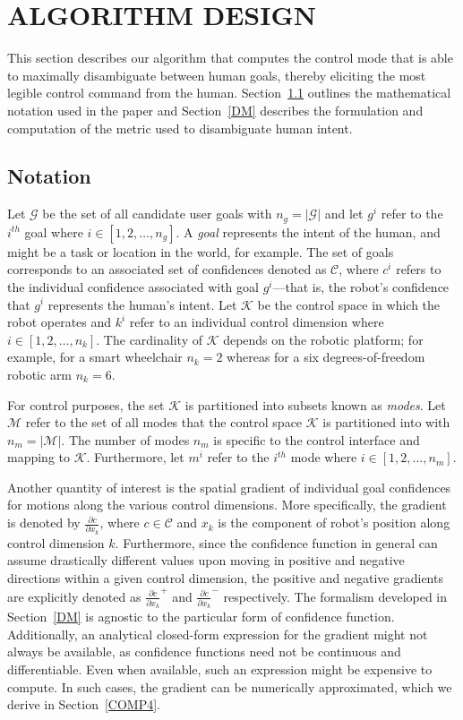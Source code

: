 \documentclass[conference]{IEEEtran}
\begin{document}
\section{ALGORITHM DESIGN} \label{ALGO}
This section describes our algorithm that computes the control mode that is able to maximally disambiguate between human goals, thereby eliciting the most legible control command from the human. Section~\ref{NOT} outlines the mathematical notation used in the paper and Section~\ref{DM} describes the formulation and computation of the metric used to disambiguate human intent. 

\subsection{Notation}\label{NOT}

Let $\mathcal{G}$ be the set of all candidate user goals with $n_g = \vert\mathcal{G}\vert$ and let $g^{i}$ refer to the $i^{th}$ goal where $i \in [1,2,\dots,n_g]$. A \textit{goal} represents the intent of the human, and might be a task or location in the world, for example. The set of goals corresponds to an associated set of confidences denoted as $\mathcal{C}$, where $c^{i}$ refers to the individual confidence associated with goal $g^{i}$---that is, the robot's confidence that $g^{i}$ represents the human's intent. Let $\mathcal{K}$ be the control space in which the robot operates and $k^{i}$ refer to an individual control dimension where $i \in [1,2,\dots,n_k]$.  The cardinality of $\mathcal{K}$ depends on the robotic platform; for example, for a smart wheelchair $n_k = 2$ whereas for a six degrees-of-freedom robotic arm $n_k = 6$.

For control purposes, the set $\mathcal{K}$ is partitioned into subsets known as \textit{modes}. Let $\mathcal{M}$ refer to the set of all modes that the control space $\mathcal{K}$ is partitioned into with $n_{m} = \vert\mathcal{M}\vert$. The number of modes $n_{m}$ is specific to the control interface and mapping to $\mathcal{K}$. Furthermore, let $m^{i}$ refer to the $i^{th}$ mode where $i \in [1,2,\dots,n_{m}]$.

Another quantity of interest is the spatial gradient of individual goal confidences for motions along the various control dimensions. More specifically, the gradient is denoted by $\frac{\partial c}{\partial x_k}$, where $c \in \mathcal{C}$ and $x_k$ is the component of robot's position along control dimension $k$. Furthermore, since the confidence function in general can assume drastically different values upon moving in positive and negative directions within a given control dimension, the positive and negative gradients are explicitly denoted as $\frac{\partial c}{\partial x_k}^{+}$ and $\frac{\partial c}{\partial x_k}^{-}$ respectively. The formalism developed in Section~\ref{DM} is agnostic to the particular form of confidence function. Additionally, an analytical closed-form expression for the gradient might not always be available, as confidence functions need not be continuous and differentiable. Even when available, such an expression might be expensive to compute. In such cases, the gradient can be numerically approximated, which we derive in Section~\ref{COMP4}.
\end{document}
